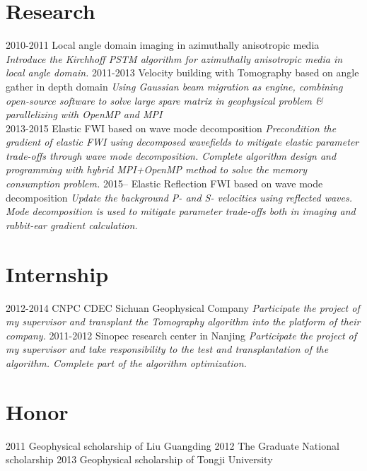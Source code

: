 \documentclass[]{friggeri-encvblackwhite}
\begin{document}
\section{Research}

\begin{entrylist}
  \entry
    {2010-2011}
	{Local angle domain imaging in azimuthally anisotropic media }
	{\emph{Introduce the Kirchhoff PSTM algorithm for azimuthally anisotropic media in
	local angle domain.}}
  \entry
    {2011-2013}
    {Velocity building with Tomography based on angle gather in depth domain}
    {\emph{Using Gaussian beam migration as engine, combining open-source software to solve large spare matrix 
		in geophysical problem \& parallelizing with OpenMP and MPI\\
	}}
  \entry
    {2013-2015}
    {Elastic FWI based on wave mode decomposition}
    {\emph{
		Precondition the gradient of elastic FWI using decomposed wavefields to 
		mitigate elastic parameter trade-offs through wave mode decomposition.
		Complete algorithm design and programming with hybrid MPI+OpenMP method
		to solve the memory consumption problem. 
	}}
  \entry
    {2015--}
    {Elastic Reflection FWI based on wave mode decomposition}
	{\emph{
		Update the background P- and S- velocities using reflected waves. 
		Mode decomposition is used to mitigate parameter trade-offs both in
		imaging and rabbit-ear gradient calculation.
	}}
\end{entrylist}

\section{Internship}
\begin{entrylist}
  \entry
    {2012-2014}
	{CNPC CDEC Sichuan Geophysical Company}
	{\emph{
		Participate the project of my supervisor and 
		transplant the Tomography algorithm into the platform of their company.
	}}
  \entry
    {2011-2012}
    {Sinopec research center in Nanjing}
	{\emph{
		Participate the project of my supervisor and take responsibility to the
		test and transplantation of the algorithm. Complete part of the algorithm
		optimization.
	}}
\end{entrylist}
\section{Honor}
\begin{entrylist}
  \entryTwo
    {2011}
    {Geophysical scholarship of Liu Guangding}
  \entryTwo
    {2012}
	{The Graduate National scholarship}
  \entryTwo
    {2013}
    {Geophysical scholarship of Tongji University}
\par\vspace{\parskip}
\end{entrylist}
\end{document}
